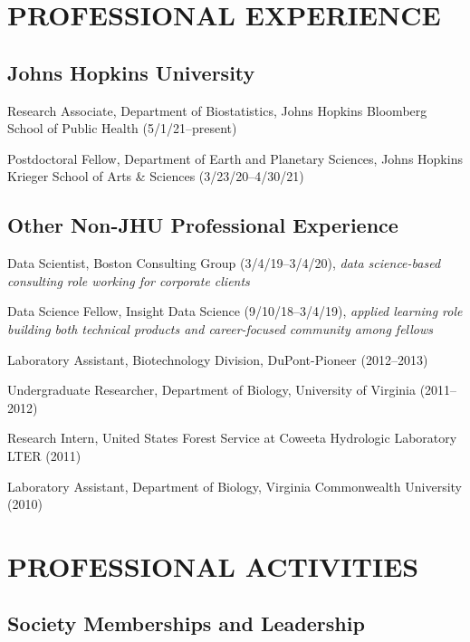 \documentclass{cv}
\begin{document}
\section*{PROFESSIONAL EXPERIENCE}

\subsection*{Johns Hopkins University}

Research Associate, Department of Biostatistics, Johns Hopkins Bloomberg School of Public Health (5/1/21--present)

Postdoctoral Fellow, Department of Earth and Planetary Sciences, Johns Hopkins Krieger School of Arts \& Sciences (3/23/20--4/30/21)

\subsection*{Other Non-JHU Professional Experience}

Data Scientist, Boston Consulting Group (3/4/19--3/4/20), \textit{data science-based consulting role working for corporate clients}

Data Science Fellow, Insight Data Science (9/10/18--3/4/19), \textit{applied learning role building both technical products and career-focused community among fellows}

Laboratory Assistant, Biotechnology Division, DuPont-Pioneer (2012--2013)

Undergraduate Researcher, Department of Biology, University of Virginia (2011--2012)

Research Intern, United States Forest Service at Coweeta Hydrologic Laboratory LTER (2011)

Laboratory Assistant, Department of Biology, Virginia Commonwealth University (2010)


\section*{PROFESSIONAL ACTIVITIES}

\subsection*{Society Memberships and Leadership}
\end{document}
